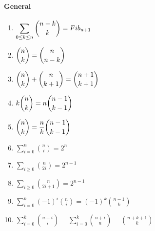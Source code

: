 \begin{enumerate}

            \end{enumerate}
\paragraph{General}\begin{enumerate}

            \item $\displaystyle \displaystyle \sum \limits_{0\leq k \leq n} {n-k \choose k} = Fib_{n+1}$
            \item $\displaystyle \displaystyle {n \choose k}={n \choose n-k}$
            \item $\displaystyle \displaystyle {n \choose k}+{n \choose k+1}={n+1 \choose k+1}$
            \item $\displaystyle \displaystyle k{n \choose k}=n{n-1 \choose k-1}$
            \item $\displaystyle \displaystyle {n \choose k}=\frac{n}{k}{n-1 \choose k-1}$
            \item $\displaystyle \sum \limits_{i=0}^n{n \choose i}=2^n$
            \item $\displaystyle \sum \limits_{i\geq 0}{n \choose 2i}=2^{n-1}$
            \item $\displaystyle \sum \limits_{i\geq 0}{n \choose 2i+1}=2^{n-1}$
            \item $\displaystyle \sum \limits_{i= 0}^k \left( -1 \right) ^i{n \choose i}=\left( -1 \right) ^k{n-1 \choose
                k}$
            
            \item $\displaystyle \sum \limits_{i= 0}^k{n+i \choose i}= \sum \limits_{i= 0}^k{n+i \choose n} = {n+k+1
                \choose
                k}$
            

\end{enumerate}
